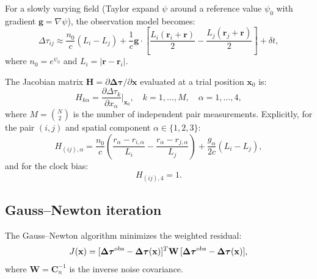 \documentclass[aps,prd,twocolumn,superscriptaddress,nofootinbib,longbibliography]{revtex4-2}
\begin{document}
For a slowly varying field (Taylor expand $\psi$ around a reference value
$\psi_0$ with gradient $\mathbf{g} = \nabla\psi$), the observation model
becomes:
\begin{equation}\label{eq:obs-linear}
\Delta\tau_{ij} \approx \frac{n_0}{c}(L_i - L_j) + \frac{1}{c}\mathbf{g}\cdot
\left[\frac{L_i(\mathbf{r}_i + \mathbf{r})}{2} - \frac{L_j(\mathbf{r}_j + \mathbf{r})}{2}\right]
+ \delta t,
\end{equation}
where $n_0 = e^{\psi_0}$ and $L_i = |\mathbf{r} - \mathbf{r}_i|$.

The Jacobian matrix $\mathbf{H} = \partial\boldsymbol{\Delta\tau}/\partial\mathbf{x}$
evaluated at a trial position $\mathbf{x}_0$ is:
\begin{equation}\label{eq:Jacobian}
H_{k\alpha} = \frac{\partial\Delta\tau_k}{\partial x_\alpha}\bigg|_{\mathbf{x}_0},
\quad k = 1,\ldots,M, \quad \alpha = 1,\ldots,4,
\end{equation}
where $M = \binom{N}{2}$ is the number of independent pair measurements.
Explicitly, for the pair $(i,j)$ and spatial component $\alpha \in \{1,2,3\}$:
\begin{equation}\label{eq:H-spatial}
H_{(ij),\alpha} = \frac{n_0}{c}\left(\frac{r_\alpha - r_{i,\alpha}}{L_i}
- \frac{r_\alpha - r_{j,\alpha}}{L_j}\right)
+ \frac{g_\alpha}{2c}\left(L_i - L_j\right),
\end{equation}
and for the clock bias:
\begin{equation}\label{eq:H-clock}
H_{(ij),4} = 1.
\end{equation}

\subsection{Gauss--Newton iteration}\label{sec:gauss-newton}

The Gauss--Newton algorithm minimizes the weighted residual:
\begin{equation}\label{eq:cost-function}
J(\mathbf{x}) = [\boldsymbol{\Delta\tau}^{\rm obs} - \boldsymbol{\Delta\tau}(\mathbf{x})]^T
\mathbf{W}\,[\boldsymbol{\Delta\tau}^{\rm obs} - \boldsymbol{\Delta\tau}(\mathbf{x})],
\end{equation}
where $\mathbf{W} = \mathbf{C}_n^{-1}$ is the inverse noise covariance.
\end{document}
